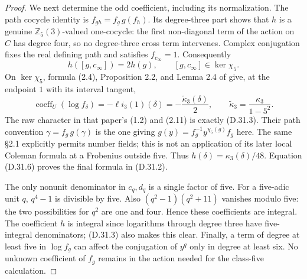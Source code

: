 \begin{proof}
We next determine the odd coefficient, including
its normalization. The path cocycle identity is
\(f_{gh}=f_g\,g(f_h)\). Its degree-three part
shows that \(h\) is a genuine
\(\mathbb Z_5(3)\)-valued one-cocycle: the
first non-diagonal term of the action on
\(C\) has degree four, so no degree-three
cross term intervenes. Complex conjugation
fixes the real defining path and satisfies
\(f_{c_\infty}=1\). Consequently
\[
        h([g,c_\infty])=2h(g),\qquad
        [g,c_\infty]\in\ker\chi_5.             \tag{D.31.6}
\]
On \(\ker\chi_5\), formula (2.4),
Proposition 2.2, and Lemma 2.4 of
\cite{DE_NakamuraSakugawaWojtkowiak2017}
give, at the endpoint \(1\) with its interval
tangent,
\[
 \operatorname{coeff}_{U}(\log f_\delta)
       =-\ell i_3(1)(\delta)
       =-\frac{\widetilde\kappa_3(\delta)}{2},
 \qquad
 \widetilde\kappa_3
       =\frac{\kappa_3}{1-5^2}.
\]
The raw character in that paper's (1.2) and
(2.11) is exactly (D.31.3). Their path convention
\(\gamma=f_g\,g(\gamma)\) is the one giving
\(g(y)=f_g^{-1}y^{\chi_5(g)}f_g\) here.
The same \S2.1 explicitly permits number fields;
this is not an application of its later local
Coleman formula at a Frobenius outside five.
Thus \(h(\delta)=\kappa_3(\delta)/48\).
Equation (D.31.6) proves the final formula
in (D.31.2).

The only nonunit denominator in \(c_q,d_q\)
is a single factor of five. For a five-adic
unit \(q\), \(q^4-1\) is divisible by five.
Also \((q^2-1)(q^2+11)\) vanishes modulo five:
the two possibilities for \(q^2\) are one
and four. Hence these coefficients are integral.
The coefficient \(h\) is integral since logarithms
through degree three have five-integral
denominators; (D.31.3) also makes this clear.
Finally, a term of degree at least five in
\(\log f_g\) can affect the conjugation of
\(y^q\) only in degree at least six. No unknown
coefficient of \(f_g\) remains in the action
needed for the class-five calculation.
\end{proof}

